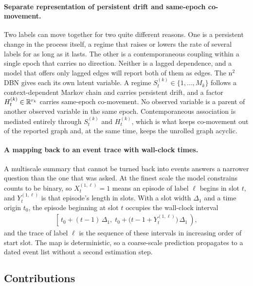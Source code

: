 \paragraph{Separate representation of persistent drift and same-epoch
co-movement.}
Two labels can move together for two quite different reasons. One is a persistent
change in the process itself, a regime that raises or lowers the rate of several
labels for as long as it lasts. The other is a contemporaneous coupling within a
single epoch that carries no direction. Neither is a lagged dependence, and a
model that offers only lagged edges will report both of them as edges. The
n\(^2\)DBN gives each its own latent variable. A regime \(S_t^{(k)} \in
\{1,\dots,M_k\}\) follows a context-dependent Markov chain and carries persistent
drift, and a factor \(H_t^{(k)} \in {\mathbb{R}}^{r_k}\) carries same-epoch co-movement.
No observed variable is a parent of another observed variable in the same epoch.
Contemporaneous association is mediated entirely through \(S_t^{(k)}\) and
\(H_t^{(k)}\), which is what keeps co-movement out of the reported graph and, at
the same time, keeps the unrolled graph acyclic.

\paragraph{A mapping back to an event trace with wall-clock times.}
A multiscale summary that cannot be turned back into events answers a narrower
question than the one that was asked. At the finest scale the model constrains
counts to be binary, so \(X_t^{(1,\ell)} = 1\) means an episode of label
\(\ell\) begins in slot \(t\), and \(Y_t^{(1,\ell)}\) is that episode's length in
slots. With a slot width \(\Delta_1\) and a time origin \(t_0\), the episode
beginning at slot \(t\) occupies the wall-clock interval
\begin{align}
\left[\,
t_0 + (t-1)\,\Delta_1,\;
t_0 + \bigl(t - 1 + Y_t^{(1,\ell)}\bigr)\,\Delta_1
\,\right),
\label{eq:intro_episode}
\end{align}
and the trace of label \(\ell\) is the sequence of these intervals in increasing
order of start slot. The map is deterministic, so a coarse-scale prediction
propagates to a dated event list without a second estimation step.

\subsection{Contributions}
\label{sec:intro_contributions}

